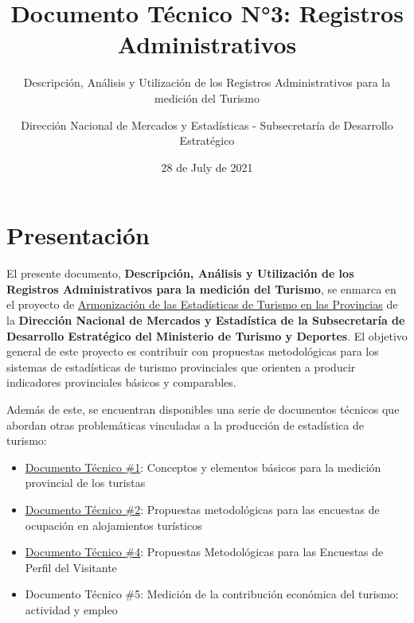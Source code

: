 \documentclass[
]{book}
\title{Documento Técnico N°3: Registros Administrativos}
\subtitle{Descripción, Análisis y Utilización de los Registros Administrativos para la medición del Turismo}
\author{Dirección Nacional de Mercados y Estadísticas - Subsecretaría de Desarrollo Estratégico}
\date{28 de July de 2021}
\let\oldmaketitle\maketitle
\begin{document}
\maketitle


\newpage

\let\maketitle\oldmaketitle
\maketitle

{
\setcounter{tocdepth}{1}
\tableofcontents
}
\hypertarget{presentaciuxf3n}{%
\chapter*{Presentación}\label{presentaciuxf3n}}

El presente documento, \textbf{Descripción, Análisis y Utilización de los Registros Administrativos para la medición del Turismo}, se enmarca en el proyecto de \href{https://armonizacion.yvera.tur.ar//}{Armonización de las Estadísticas de Turismo en las Provincias} de la \textbf{Dirección Nacional de Mercados y Estadística de la Subsecretaría de Desarrollo Estratégico del Ministerio de Turismo y Deportes}. El objetivo general de este proyecto es contribuir con propuestas metodológicas para los sistemas de estadísticas de turismo provinciales que orienten a producir indicadores provinciales básicos y comparables.

Además de este, se encuentran disponibles una serie de documentos técnicos que abordan otras problemáticas vinculadas a la producción de estadística de turismo:

\begin{itemize}
\item
  \href{https://dnme-minturdep.github.io/DT1_medicion_turismo/}{Documento Técnico \#1}: Conceptos y elementos básicos para la medición provincial de los turistas
\item
  \href{https://dnme-minturdep.github.io/DT2_encuestas/}{Documento Técnico \#2}: Propuestas metodológicas para las encuestas de ocupación en alojamientos turísticos
\item
  \href{https://dnme-minturdep.github.io/DT4_perfiles/}{Documento Técnico \#4}: Propuestas Metodológicas para las Encuestas de Perfil del Visitante
\item
  Documento Técnico \#5: Medición de la contribución económica del turismo: actividad y empleo
\end{itemize}
\end{document}
